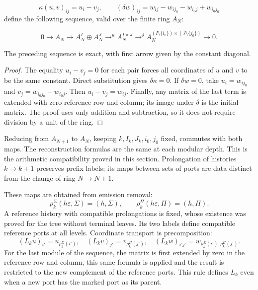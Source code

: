 \[
\kappa(u,v)_{ij}=u_i-v_j,
\qquad
(\delta w)_{ij}=w_{ij}-w_{ij_0}-w_{i_0j}+w_{i_0j_0}
\]
define the following sequence, valid over the finite ring \(A_N\):

\[
0\longrightarrow A_N\longrightarrow
A_N^I\oplus A_N^J\mathrel{\mathop{\longrightarrow}^{\kappa}}
A_N^{I\times J}\mathrel{\mathop{\longrightarrow}^{\delta}}
A_N^{(I\setminus\{i_0\})\times(J\setminus\{j_0\})}
\longrightarrow0.
\]
\begin{proposition}
\label{x_reciprocidad:iv:cont:rectangular-exacta}
The preceding sequence is exact, with first arrow given by the constant diagonal.

\end{proposition}
\begin{proof}
The equality \(u_i-v_j=0\) for each pair forces all coordinates of \(u\) and \(v\) to be the same constant. Direct substitution gives \(\delta\kappa=0\). If \(\delta w=0\), take \(u_i=w_{ij_0}\) and \(v_j=w_{i_0j_0}-w_{i_0j}\). Then \(u_i-v_j=w_{ij}\). Finally, any matrix of the last term is extended with zero reference row and column; its image under \(\delta\) is the initial matrix. The proof uses only addition and subtraction, so it does not require division by a unit of the ring.
\end{proof}

Reducing from \(A_{N+1}\) to \(A_N\), keeping \(k,I_k,J_k,i_0,j_0\) fixed, commutes with both maps. The reconstruction formulas are the same at each modular depth. This is the arithmetic compatibility proved in this section. Prolongation of histories \(k\to k+1\) preserves prefix labels; its maps between sets of ports are data distinct from the change of ring \(N\to N+1\).

These maps are obtained from emission removal:
\[
\rho_k^\Sigma(h\varepsilon,\Sigma)=(h,\Sigma),\qquad
\rho_k^\Pi(h\varepsilon,\Pi)=(h,\Pi).
\]
A reference history with compatible prolongations is fixed, whose existence was proved for the tree without terminal leaves. Its two labels define compatible reference ports at all levels. Coordinate transport is precomposition:
\[
(L_ku)_{i'}=u_{\rho_k^\Sigma(i')},\quad
(L_kv)_{j'}=v_{\rho_k^\Pi(j')},\quad
(L_kw)_{i'j'}=w_{\rho_k^\Sigma(i'),\rho_k^\Pi(j')}.
\]
For the last module of the sequence, the matrix is first extended by zero in the reference row and column, this same formula is applied and the result is restricted to the new complement of the reference ports. This rule defines \(L_k\) even when a new port has the marked port as its parent.

